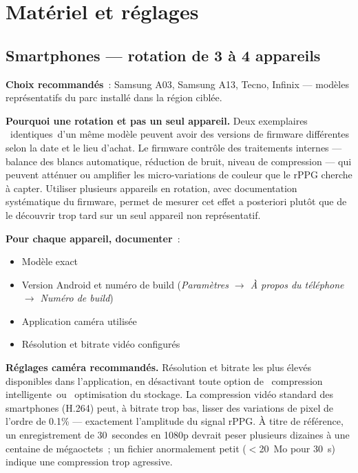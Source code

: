 \documentclass[11pt,a4paper]{article}
\begin{document}
\newpage
\section{Mat\'eriel et r\'eglages}

\subsection{Smartphones --- rotation de 3 \`a 4 appareils}

\textbf{Choix recommand\'es}~: Samsung A03, Samsung A13, Tecno, Infinix ---
mod\`eles repr\'esentatifs du parc install\'e dans la r\'egion cibl\'ee.

\textbf{Pourquoi une rotation et pas un seul appareil.} Deux exemplaires
\guillemotleft~identiques\guillemotright\ d'un m\^eme mod\`ele peuvent avoir
des versions de firmware diff\'erentes selon la date et le lieu d'achat. Le
firmware contr\^ole des traitements internes --- balance des blancs
automatique, r\'eduction de bruit, niveau de compression --- qui peuvent
att\'enuer ou amplifier les micro-variations de couleur que le rPPG cherche
\`a capter. Utiliser plusieurs appareils en rotation, avec documentation
syst\'ematique du firmware, permet de mesurer cet effet a posteriori plut\^ot
que de le d\'ecouvrir trop tard sur un seul appareil non repr\'esentatif.

\textbf{Pour chaque appareil, documenter}~:
\begin{itemize}
\item Mod\`ele exact
\item Version Android et num\'ero de build (\emph{Param\`etres $\rightarrow$
\`A propos du t\'el\'ephone $\rightarrow$ Num\'ero de build})
\item Application cam\'era utilis\'ee
\item R\'esolution et bitrate vid\'eo configur\'es
\end{itemize}

\textbf{R\'eglages cam\'era recommand\'es.} R\'esolution et bitrate les plus
\'elev\'es disponibles dans l'application, en d\'esactivant toute option de
\guillemotleft~compression intelligente\guillemotright\ ou
\guillemotleft~optimisation du stockage\guillemotright. La compression
vid\'eo standard des smartphones (H.264) peut, \`a bitrate trop bas, lisser
des variations de pixel de l'ordre de 0.1\% --- exactement l'amplitude du
signal rPPG. \`A titre de r\'ef\'erence, un enregistrement de 30~secondes en
1080p devrait peser plusieurs dizaines \`a une centaine de m\'egaoctets~; un
fichier anormalement petit ($<$20~Mo pour 30~s) indique une compression
trop agressive.
\end{document}
